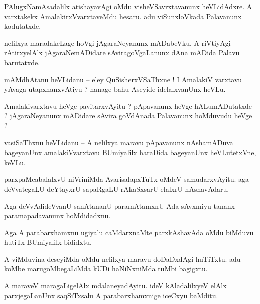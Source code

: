 \documentclass{article}
\begin{document}
\begin{mn}%
PAlugxNamAsadalilx atishayavAgi oMdu visheVSavrxtavanunx heVLidAdxre. A varxtakekx 
AmalakirxVvarxtaveMdu hesaru. adu viSunxloVkada Palavanunx kodutatxde.
\end{mn}

\begin{mn}%
nelilxya maradakeLage hoVgi jAgaraNeyanunx mADabeVku. A riVtiyAgi rAtirxyelAlx jAgaraNemADidare 
sAviragoVgaLanunx dAna mADida Palavu barutatxde.
\end{mn}

\begin{mn}%
mAMdhAtanu heVLidanu -- eley QuSisherxVSaThxne ! I AmalakiV varxtavu yAvaga utapxnanxvAtiyu ? 
nanage bahu Aseyide idelalxvanUnx heVLu.
\end{mn}

\begin{mn}%
Amalakivarxtavu heVge pavitarxvAyitu ? pApavanunx heVge hALumADutatxde ? jAgaraNeyanunx mADidare 
sAvira goVdAnada Palavanunx hoMduvudu heVge ?
\end{mn}

\begin{mn}%
vasiSaThxnu heVLidanu -- A nelilxya maravu pApavanunx nAshamADuva bageyanUnx amalakiVvarxtavu 
BUmiyalilx haraDida bageyanUnx heVLutetxVne, keVLu.
\end{mn}

\begin{mn}%
parxpaMcabalalxvU niVriniMda AvarisalapxTuTx oMdeV samudarxvAyitu. aga deVvategaLU deYtayxrU 
sapaRgaLU rAkaSxsarU elalxrU nAshavAdaru.
\end{mn}

\begin{mn}%
Aga deVvAdideVvanU sanAtananU paramAtamxnU Ada sAvxmiyu tananx paramapadavanunx hoMdidadxnu.
\end{mn}

\begin{mn}%
Aga A parabarxhamxnu ugiyalu caMdarxnaMte parxkAshavAda oMdu biMduvu hutiTx BUmiyalilx bididxtu.
\end{mn}

\begin{mn}%
A viMduvina deseyiMda oMdu nelilxya maravu doDaDxdAgi huTiTxtu. adu koMbe marugoMbegaLiMda kUDi 
haNiNxniMda tuMbi bagigxtu.
\end{mn}

\begin{mn}%
A maraveV maragaLigelAlx mdalaneyadAyitu. ideV kAladalilxyeV elAlx parxjegaLanUnx saqSiTxsalu A 
parabarxhamxnige iceCxyu baMditu.
\end{mn}
\end{document}
